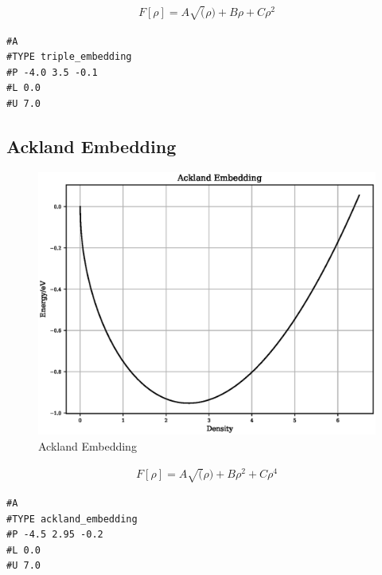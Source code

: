 \begin{equation}
\begin{split}
F[\rho] = A \sqrt(\rho) + B \rho + C \rho^2
\end{split}
\label{eq:tripleEmbedding}
\end{equation}

\begin{lstlisting}[style=sPseudo,caption={Triple Embedding}]
#A
#TYPE triple_embedding
#P -4.0 3.5 -0.1
#L 0.0
#U 7.0
\end{lstlisting}



\clearpage
\FloatBarrier
\subsection{Ackland Embedding}

\begin{figure}[h]
  \begin{center}
    \includegraphics[width=120mm]{appendix/functions/plots/ackland_embedding.eps}
    \caption{Ackland Embedding}
    \label{graph:graph1}
  \end{center}
\end{figure}

\begin{equation}
\begin{split}
F[\rho] = A \sqrt(\rho) + B \rho^2 + C \rho^4
\end{split}
\label{eq:acklandEmbedding}
\end{equation}

\begin{lstlisting}[style=sPseudo,caption={Ackland Embedding}]
#A
#TYPE ackland_embedding
#P -4.5 2.95 -0.2
#L 0.0
#U 7.0
\end{lstlisting}











